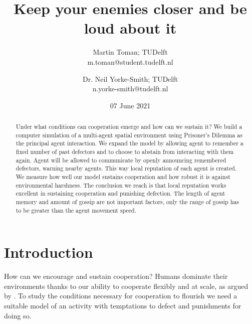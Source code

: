 \documentclass[english]{article}
\begin{document}
\listoftodos

\title{Keep your enemies closer and be loud about it}
\author{
  Martin Toman; TUDelft
  \\
  m.toman@student.tudelft.nl
\and
  Dr. Neil Yorke-Smith; TUDelft
  \\
  n.yorke-smith@tudelft.nl
}
\date{07 June 2021}
\maketitle


\begin{abstract}

Under what conditions can cooperation emerge and how can we sustain it?
We build a computer simulation of a multi-agent spatial environment using Prisoner's Dilemma as the principal agent interaction.
We expand the model by allowing agent to remember a fixed number of past defectors and to choose to abstain from interacting with them again.
Agent will be allowed to communicate by openly announcing remembered defectors, warning nearby agents.
This way local reputation of each agent is created.
We measure how well our model sustains cooperation and how robust it is against environmental harshness.
The conclusion we reach is that local reputation works excellent in sustaining cooperation and punishing defection.
The length of agent memory and amount of gossip are not important factors, only the range of gossip has to be greater than the agent movement speed.

\end{abstract}



\section{Introduction}

How can we encourage and sustain cooperation? Humans dominate their environments thanks to our ability to cooperate flexibly and at scale, as argued by \citet{harari-sapiens}.
To study the conditions necessary for cooperation to flourish we need a suitable model of an activity with temptations to defect and punishments for doing so.
\end{document}

